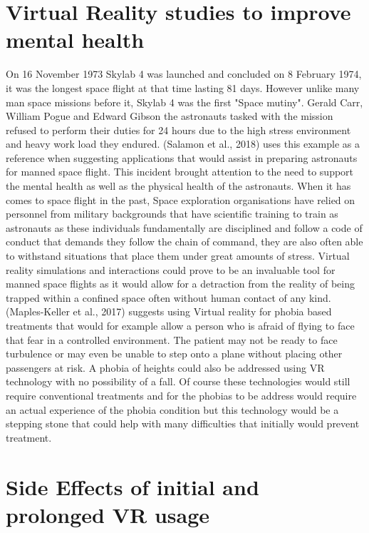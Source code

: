 \documentclass[10pt,journal,compsoc]{IEEEtran}
\begin{document}
	\section{Virtual Reality studies to improve mental health}
	 On 16 November 1973 Skylab 4 was launched and concluded on 8 February 1974, it was the longest space flight at that time lasting 81 days. However unlike many man space missions before it, Skylab 4 was the first "Space mutiny". Gerald Carr, William Pogue and Edward Gibson the astronauts tasked with the mission refused to perform their duties for 24 hours due to the high stress environment and heavy work load they endured. (Salamon et al., 2018) uses this example as a reference when suggesting applications that would assist in preparing astronauts for manned space flight. This incident brought attention to the need to support the mental health as well as the physical health of the astronauts. When it has comes to space flight in the past, Space exploration organisations have relied on personnel from military backgrounds that have scientific training to train as astronauts as these individuals fundamentally are disciplined and follow a code of conduct that demands they follow the chain of command, they are also often able to withstand situations that place them under great amounts of stress. Virtual reality simulations and interactions could prove to be an invaluable tool for manned space flights as it would allow for a detraction from the reality of being trapped within a confined space often without human contact of any kind. \newline \newline
	 (Maples-Keller et al., 2017) suggests using Virtual reality for phobia based treatments that would for example allow a person who is afraid of flying to face that fear in a controlled environment. The patient may not be ready to face turbulence or may even be unable to step onto a plane without placing other passengers at risk. A phobia of heights could also be addressed using VR technology with no possibility of a fall. Of course these technologies would still require conventional treatments and for the phobias to be address would require an actual experience of the phobia condition but this technology would be a stepping stone that could help with many difficulties that initially would prevent treatment.

	\section{Side Effects of initial and prolonged VR usage}
	
\end{document}
